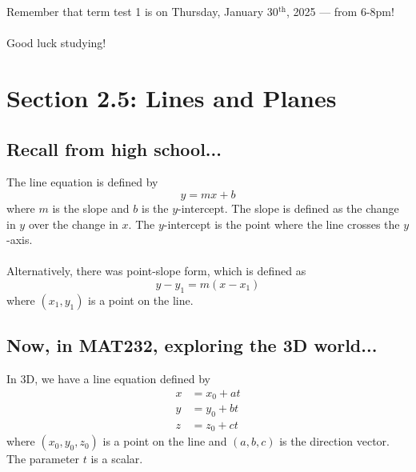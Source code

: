 \documentclass{article}
\begin{document}
\renewcommand{\familydefault}{\rmdefault}



\setcounter{page}{0}
\newpage
\tableofcontents
\newpage






\normalsize

\setcounter{page}{1}

\begin{notebox}
Remember that term test 1 is on Thursday, January 30$^{\text{th}}$, 2025 — from 6-8pm! \\
\\
Good luck studying!
\end{notebox}

\section*{Section 2.5: Lines and Planes}
\subsection*{Recall from high school...}
The line equation is defined by
\[
    y = mx + b
\]
where $m$ is the slope and $b$ is the $y$-intercept. The slope is defined as the change in $y$ over the change in $x$. The $y$-intercept is the point where the line crosses the $y$-axis. \\
\\
Alternatively, there was point-slope form, which is defined as
\[
    y - y_1 = m(x - x_1)
\]
where $(x_1, y_1)$ is a point on the line. \\

\subsection*{Now, in MAT232, exploring the 3D world...}
\begin{definitionbox}
In 3D, we have a line equation defined by
\[
    \begin{aligned}
        x &= x_0 + at \\
        y &= y_0 + bt \\
        z &= z_0 + ct
    \end{aligned}
\]
where $(x_0, y_0, z_0)$ is a point on the line and $(a, b, c)$ is the direction vector. The parameter $t$ is a scalar.
\end{definitionbox}
\end{document}
